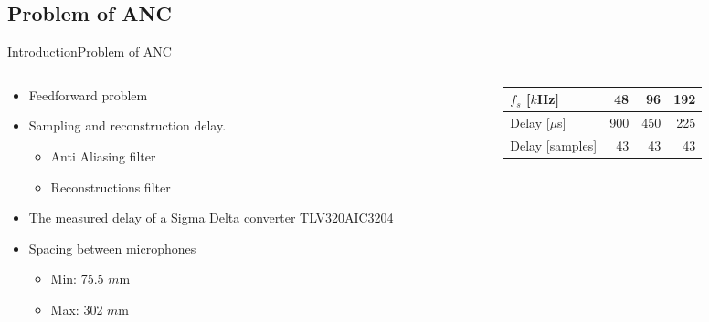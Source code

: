 \subsection{Problem of ANC}
\begin{frame}{Introduction}{Problem of ANC}		
	\begin{columns}
		\begin{column}{0.5\textwidth}
		\begin{itemize}
		\item Feedforward problem
		\item Sampling and reconstruction delay.
		\begin{itemize}
			\item Anti Aliasing filter
			\item Reconstructions filter
		\end{itemize}
		\item The measured delay of a Sigma Delta converter TLV320AIC3204
		\item Spacing between microphones
		\begin{itemize}
			\item Min: 75.5 $m$m
			\item Max: 302 $m$m
		\end{itemize}
		\end{itemize}
		\end{column}
		\begin{column}{0.5\textwidth} 
		\begin{table}[H]
			\centering
			\begin{tabular}{|l|r|r|r|}
				\hline
				$f_s$ {[}$k$Hz{]} & 48 & 96 & 192 \\ \hline
				Delay {[}$\mu$s{]} & 900 & 450 & 225 \\ \hline
				Delay {[}samples{]} & 43 & 43 & 43 \\ \hline
			\end{tabular}
		\end{table}
		\end{column}
	\end{columns}
\end{frame}






